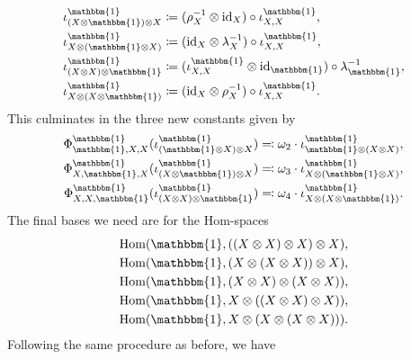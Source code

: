 \begin{example}
\begin{align*}
\begin{split}
\iota_{(X \otimes {\mathbbm{1}}) \otimes X}^{\mathbbm{1}} &\coloneqq (\rho_X^{-1} \otimes \id_X) \circ \iota_{X,X}^{{\mathbbm{1}}},\\
\iota_{X \otimes ({\mathbbm{1}} \otimes X)}^{\mathbbm{1}} &\coloneqq (\id_X \otimes \lambda_X^{-1}) \circ \iota_{X,X}^{{\mathbbm{1}}},\\
\iota_{(X \otimes X) \otimes {\mathbbm{1}}}^{\mathbbm{1}} &\coloneqq (\iota_{X,X}^{{\mathbbm{1}}} \otimes \id_{\mathbbm{1}}) \circ \lambda_{\mathbbm{1}}^{-1},\\
\iota_{X \otimes (X \otimes {\mathbbm{1}})}^{\mathbbm{1}} &\coloneqq (\id_X \otimes \rho_X^{-1}) \circ \iota_{X,X}^{{\mathbbm{1}}}.
\end{split}
\end{align*}
\noindent This culminates in the three new constants given by
\begin{align*}
\begin{split}
\Phi_{{\mathbbm{1}},X,X}^{\mathbbm{1}}(\iota_{({\mathbbm{1}} \otimes X) \otimes X}^{\mathbbm{1}}) &\eqqcolon \omega_2 \cdot \iota_{{\mathbbm{1}} \otimes (X \otimes X)}^{\mathbbm{1}},\\
\Phi_{X,{\mathbbm{1}},X}^{\mathbbm{1}}(\iota_{(X \otimes {\mathbbm{1}}) \otimes X}^{\mathbbm{1}}) &\eqqcolon \omega_3 \cdot \iota_{X \otimes ({\mathbbm{1}} \otimes X)}^{\mathbbm{1}},\\
\Phi_{X,X,{\mathbbm{1}}}^{\mathbbm{1}}(\iota_{(X \otimes X) \otimes {\mathbbm{1}}}^{\mathbbm{1}}) &\eqqcolon \omega_4 \cdot \iota_{X \otimes (X \otimes {\mathbbm{1}})}^{\mathbbm{1}}.
\end{split}
\end{align*}
\noindent The final bases we need are for the Hom-spaces
\begin{align*}
\begin{split}
\homset({\mathbbm{1}}, ((X \otimes X) \otimes X) \otimes X),\\
\homset({\mathbbm{1}}, (X \otimes (X \otimes X)) \otimes X),\\
\homset({\mathbbm{1}}, (X \otimes X) \otimes (X \otimes X)),\\
\homset({\mathbbm{1}}, X \otimes ((X \otimes X) \otimes X)),\\
\homset({\mathbbm{1}}, X \otimes (X \otimes (X \otimes X))).
\end{split}
\end{align*}
\noindent Following the same procedure as before, we have
\begin{align*}
\begin{split}

\end{split}
\end{align*}
\end{example}

